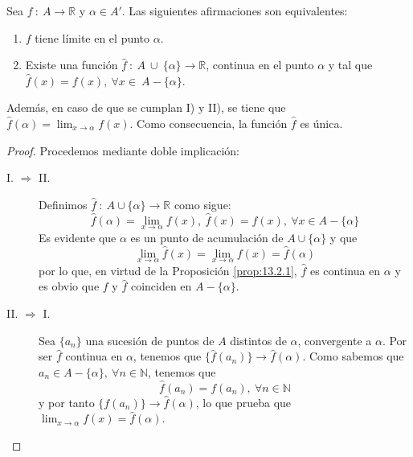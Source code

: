 \begin{prop}
    Sea $f ~:~ A \longrightarrow \mathbb{R}$ y $\alpha \in A'$. Las siguientes afirmaciones son equivalentes:
    \begin{enumerate}
        \item $f$ tiene límite en el punto $\alpha$.
        \item Existe una función $\hat{f} ~:~ A ~\cup~ \{\alpha\} \longrightarrow \mathbb{R}$, continua en el punto $\alpha$ y tal que $\hat{f}(x) =f(x),~ \forall x \in~A-\{\alpha\}$.
    \end{enumerate}
    Además, en caso de que se cumplan I) y II), se tiene que $\hat{f}(\alpha) = \displaystyle\lim_{x \to \alpha} f(x)$.
    Como consecuencia, la función $\hat{f}$ es única.
\end{prop}
\begin{proof} Procedemos mediante doble implicación:
\begin{description}
    \item [I. $\Longrightarrow$ II.]
    Definimos $\hat{f} ~:~ A \cup \{\alpha\} \longrightarrow \mathbb{R}$ como sigue:
    \begin{equation*}
        \hat{f}(\alpha) = \displaystyle\lim_{x \to \alpha} f(x), ~ \hat{f}(x) = f(x), ~ \forall x \in A-\{\alpha\}
    \end{equation*}
    Es evidente que $\alpha$ es un punto de acumulación de $A \cup \{\alpha\}$ y que
    \begin{equation*}
        \displaystyle\lim_{x \to \alpha} \hat{f}(x) = \displaystyle\lim_{x \to \alpha} f(x) = \hat{f}(\alpha)
    \end{equation*}
    por lo que, en virtud de la Proposición \ref{prop:13.2.1}, $\hat{f}$ es continua en $\alpha$ y
    es obvio que $f$ y $\hat{f}$ coinciden en $A-\{\alpha\}$.

    \item [II. $\Longrightarrow$ I.]
    Sea $\{a_n\}$ una sucesión de puntos de $A$ distintos de $\alpha$, convergente a $\alpha$.
    Por ser $\hat{f}$ continua en $\alpha$, tenemos que $\{\hat{f}(a_n)\} \longrightarrow \hat{f}(\alpha)$.
    \newline
    \newline
    Como sabemos que $a_n \in A - \{\alpha\}, ~ \forall n \in \mathbb{N}$, tenemos que
    \begin{equation*}
        \hat{f}(a_n) = f(a_n), ~ \forall n \in \mathbb{N}
    \end{equation*}
    y por tanto $\{f(a_n)\} \longrightarrow \hat{f}(\alpha)$, lo que prueba que $\displaystyle\lim_{x \to \alpha} f(x) = \hat{f}(\alpha)$.
\end{description}
    
\end{proof}

